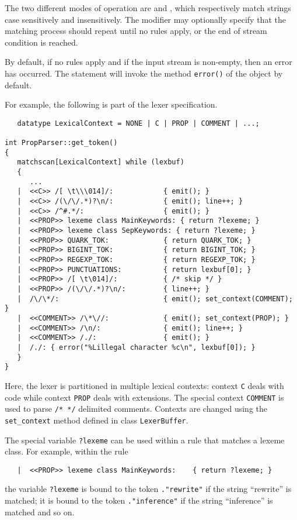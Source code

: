 The two different modes of operation are  and ,
which respectively match strings case sensitively and insensitively.
The modifier  may optionally specify that the matching process
should repeat until no rules apply, or the end of stream condition
is reached.  

By default, if no rules apply and if the input stream is non-empty,
then an error has occurred.  The  statement will
invoke the method \verb|error()| of the  object by default.

For example, the following is part of the \Prop{} lexer specification.

\begin{verbatim}
   datatype LexicalContext = NONE | C | PROP | COMMENT | ...;

int PropParser::get_token()
{
   matchscan[LexicalContext] while (lexbuf)
   {  
      ...
   |  <<C>> /[ \t\\\014]/:            { emit(); }
   |  <<C>> /(\/\/.*)?\n/:            { emit(); line++; }
   |  <<C>> /^#.*/:                   { emit(); }
   |  <<PROP>> lexeme class MainKeywords: { return ?lexeme; }
   |  <<PROP>> lexeme class SepKeywords: { return ?lexeme; }
   |  <<PROP>> QUARK_TOK:             { return QUARK_TOK; }
   |  <<PROP>> BIGINT_TOK:            { return BIGINT_TOK; }
   |  <<PROP>> REGEXP_TOK:            { return REGEXP_TOK; }
   |  <<PROP>> PUNCTUATIONS:          { return lexbuf[0]; }
   |  <<PROP>> /[ \t\014]/:           { /* skip */ }
   |  <<PROP>> /(\/\/.*)?\n/:         { line++; }
   |  /\/\*/:                         { emit(); set_context(COMMENT); }
   |  <<COMMENT>> /\*\//:             { emit(); set_context(PROP); }
   |  <<COMMENT>> /\n/:               { emit(); line++; }
   |  <<COMMENT>> /./:                { emit(); }
   |  /./: { error("%Lillegal character %c\n", lexbuf[0]); }
   }
}
\end{verbatim}

Here, the lexer is partitioned in multiple lexical contexts: context
\verb|C| deals with \Cpp{} code while context \verb|PROP| deals with
\Prop{} extensions.  The special context \verb|COMMENT| is used
to parse \verb|/* */| delimited comments.  Contexts are changed
using the \verb|set_context| method defined in class \verb|LexerBuffer|.

The special variable \verb|?lexeme| can be used within a rule 
that matches a lexeme class.  For example, within the rule
\begin{verbatim}
   |  <<PROP>> lexeme class MainKeywords:    { return ?lexeme; }
\end{verbatim}
the variable \verb|?lexeme| is bound to 
the token \verb|."rewrite"| if the string ``rewrite'' is matched;
it is bound to the token \verb|."inference"| if the string
``inference'' is matched and so on.

